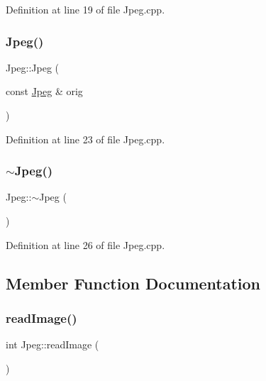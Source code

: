 Definition at line 19 of file Jpeg.\+cpp.

\mbox{\label{classJpeg_abc02dc366057e25e538b8c76c5463554}} 
\subsubsection{\texorpdfstring{Jpeg()}{Jpeg()}\hspace{0.1cm}{\footnotesize\ttfamily [3/3]}}
{\footnotesize\ttfamily Jpeg\+::\+Jpeg (\begin{DoxyParamCaption}\item[{const \mbox{\hyperlink{classJpeg}{Jpeg}} \&}]{orig }\end{DoxyParamCaption})}



Definition at line 23 of file Jpeg.\+cpp.

\mbox{\label{classJpeg_aa03b879cc5185f52c4c9e39faf03db85}} 
\subsubsection{\texorpdfstring{$\sim$Jpeg()}{~Jpeg()}}
{\footnotesize\ttfamily Jpeg\+::$\sim$\+Jpeg (\begin{DoxyParamCaption}{ }\end{DoxyParamCaption})\hspace{0.3cm}{\ttfamily [virtual]}}



Definition at line 26 of file Jpeg.\+cpp.



\subsection{Member Function Documentation}
\mbox{\label{classJpeg_a80db9e22efc544e32145b6743b2b407c}} 
\subsubsection{\texorpdfstring{readImage()}{readImage()}}
{\footnotesize\ttfamily int Jpeg\+::read\+Image (\begin{DoxyParamCaption}{ }\end{DoxyParamCaption})}



